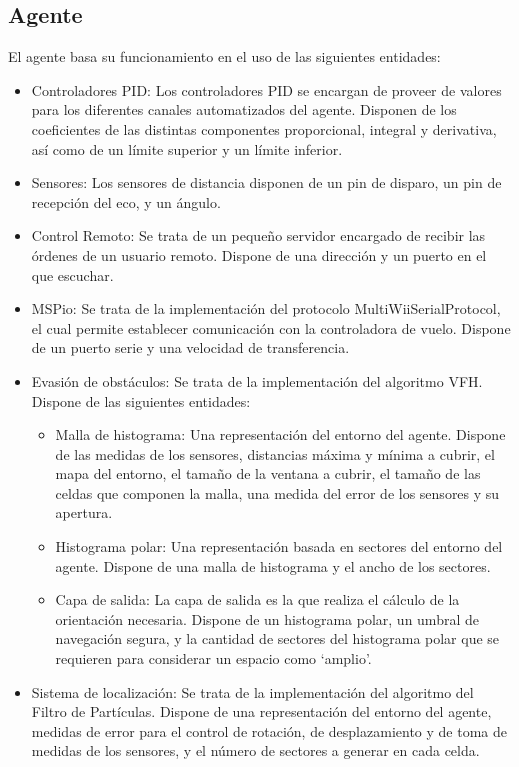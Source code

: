 \subsection{Agente}
El agente basa su funcionamiento en el uso de las siguientes entidades: 
\begin{itemize}
\item Controladores PID: Los controladores PID se encargan de proveer de valores para los diferentes canales automatizados del agente. Disponen de los coeficientes de las distintas componentes proporcional, integral y derivativa, así como de un límite superior y un límite inferior.
\item Sensores: Los sensores de distancia disponen de un pin de disparo, un pin de recepción del eco, y un ángulo.
\item Control Remoto: Se trata de un pequeño servidor encargado de recibir las órdenes de un usuario remoto. Dispone de una dirección y un puerto en el que escuchar. 
\item MSPio: Se trata de la implementación del protocolo MultiWiiSerialProtocol, el cual permite establecer comunicación con la controladora de vuelo. Dispone de un puerto serie y una velocidad de transferencia.
\item Evasión de obstáculos: Se trata de la implementación del algoritmo VFH. Dispone de las siguientes entidades: 
	\begin{itemize}
	\item Malla de histograma: Una representación del entorno del agente. Dispone de las medidas de los sensores, distancias máxima y mínima a cubrir, el mapa del entorno, el tamaño de la ventana a cubrir, el tamaño de las celdas que componen la malla, una medida del error de los sensores y su apertura.
	\item Histograma polar: Una representación basada en sectores del entorno del agente. Dispone de una malla de histograma y el ancho de los sectores.
	\item Capa de salida: La capa de salida es la que realiza el cálculo de la orientación necesaria. Dispone de un histograma polar, un umbral de navegación segura, y la cantidad de sectores del histograma polar que se requieren para considerar un espacio como `amplio'.
	\end{itemize}
\item Sistema de localización: Se trata de la implementación del algoritmo del Filtro de Partículas. Dispone de una representación del entorno del agente, medidas de error para el control de rotación, de desplazamiento y de toma de medidas de los sensores, y el número de sectores a generar en cada celda. 
\end{itemize}


